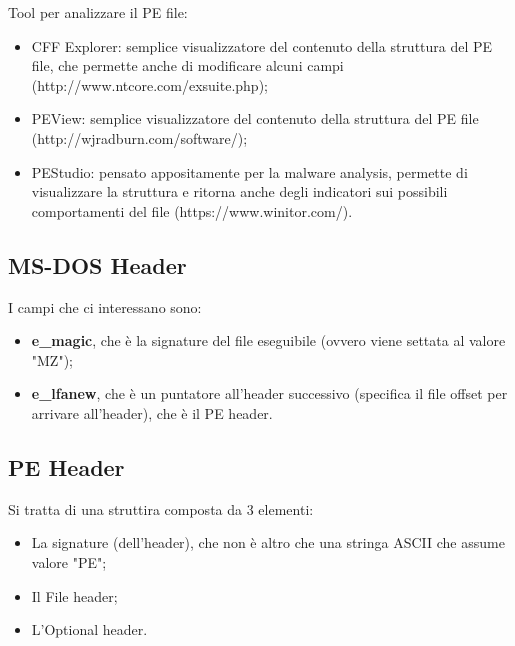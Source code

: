 \documentclass[a4paper]{book}
\begin{document}
Tool per analizzare il PE file:
\begin{itemize}
    \item CFF Explorer: semplice visualizzatore del contenuto della struttura del PE file, che permette anche di modificare alcuni campi (http://www.ntcore.com/exsuite.php);
    \item PEView: semplice visualizzatore del contenuto della struttura del PE file (http://wjradburn.com/software/);
    \item PEStudio: pensato appositamente per la malware analysis, permette di visualizzare la struttura e ritorna anche degli indicatori sui possibili comportamenti del file (https://www.winitor.com/).
\end{itemize}

\subsection{MS-DOS Header}
I campi che ci interessano sono:
\begin{itemize}
    \item \textbf{e\_magic}, che è la signature del file eseguibile (ovvero viene settata al valore "MZ");
    \item \textbf{e\_lfanew}, che è un puntatore all'header successivo (specifica il file offset per arrivare all'header), che è il PE header.
\end{itemize}

\subsection{PE Header}
Si tratta di una struttira composta da 3 elementi:
\begin{itemize}
    \item La signature (dell'header), che non è altro che una stringa ASCII che assume valore "PE";
    \item Il File header;
    \item L'Optional header.
\end{itemize}
\end{document}

